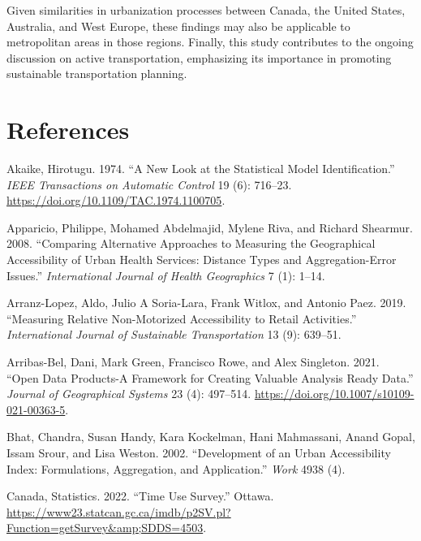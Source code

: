 \documentclass[preprint, 3p,
authoryear]{elsarticle} %
\newlength{\cslhangindent}
\newlength{\cslentryspacingunit} %
\newenvironment{CSLReferences}[2] %
 {%
  \setlength{\parindent}{0pt}
  \ifodd #1
  \let\oldpar\par
  \def\par{\hangindent=\cslhangindent\oldpar}
  \fi
  \setlength{\parskip}{#2\cslentryspacingunit}
 }%
 {}
\begin{document}
Given similarities in urbanization processes between Canada, the United
States, Australia, and West Europe, these findings may also be
applicable to metropolitan areas in those regions. Finally, this study
contributes to the ongoing discussion on active transportation,
emphasizing its importance in promoting sustainable transportation
planning.

\hypertarget{references}{%
\section*{References}\label{references}}

\hypertarget{refs}{}
\begin{CSLReferences}{1}{0}
\leavevmode{}%
Akaike, Hirotugu. 1974. {``A New Look at the Statistical Model
Identification.''} \emph{IEEE Transactions on Automatic Control} 19 (6):
716--23. \url{https://doi.org/10.1109/TAC.1974.1100705}.

\leavevmode{}%
Apparicio, Philippe, Mohamed Abdelmajid, Mylene Riva, and Richard
Shearmur. 2008. {``Comparing Alternative Approaches to Measuring the
Geographical Accessibility of Urban Health Services: Distance Types and
Aggregation-Error Issues.''} \emph{International Journal of Health
Geographics} 7 (1): 1--14.

\leavevmode{}%
Arranz-Lopez, Aldo, Julio A Soria-Lara, Frank Witlox, and Antonio Paez.
2019. {``Measuring Relative Non-Motorized Accessibility to Retail
Activities.''} \emph{International Journal of Sustainable
Transportation} 13 (9): 639--51.

\leavevmode{}%
Arribas-Bel, Dani, Mark Green, Francisco Rowe, and Alex Singleton. 2021.
{``Open Data Products-A Framework for Creating Valuable Analysis Ready
Data.''} \emph{Journal of Geographical Systems} 23 (4): 497--514.
\url{https://doi.org/10.1007/s10109-021-00363-5}.

\leavevmode{}%
Bhat, Chandra, Susan Handy, Kara Kockelman, Hani Mahmassani, Anand
Gopal, Issam Srour, and Lisa Weston. 2002. {``Development of an Urban
Accessibility Index: Formulations, Aggregation, and Application.''}
\emph{Work} 4938 (4).

\leavevmode{}%
Canada, Statistics. 2022. {``Time Use Survey.''} Ottawa.
\url{https://www23.statcan.gc.ca/imdb/p2SV.pl?Function=getSurvey\&amp;SDDS=4503}.


\end{CSLReferences}
\end{document}
